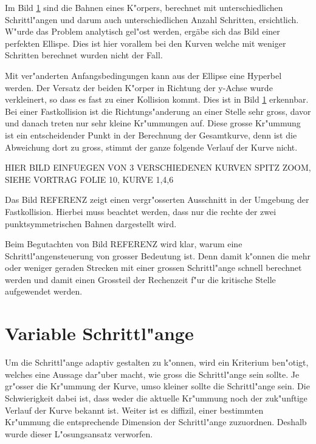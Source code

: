 \begin{refsection}
\begin{tabular}{|c|c|c|c|c|c|}
\end{tabular}

Im Bild \ref{} sind die Bahnen eines K"orpers, berechnet mit unterschiedlichen Schrittl"angen und darum auch unterschiedlichen Anzahl Schritten, ersichtlich.
W"urde das Problem analytisch gel"ost werden, ergäbe sich das Bild einer perfekten Ellispe.
Dies ist hier vorallem bei den Kurven welche mit weniger Schritten berechnet wurden nicht der Fall.

Mit ver"anderten Anfangsbedingungen kann aus der Ellipse eine Hyperbel werden.
Der Versatz der beiden K"orper in Richtung der y-Achse wurde verkleinert, so dass es fast zu einer Kollision kommt. 
Dies ist in Bild \ref{} erkennbar.
Bei einer Fastkollision ist die Richtungs"anderung an einer Stelle sehr gross, davor und danach treten nur sehr kleine Kr"ummungen auf.
Diese grosse Kr"ummung ist ein entscheidender Punkt in der Berechnung der Gesamtkurve, denn ist die Abweichung dort zu gross, stimmt der ganze folgende Verlauf der Kurve nicht. 

HIER BILD EINFUEGEN VON 3 VERSCHIEDENEN KURVEN SPITZ ZOOM, SIEHE VORTRAG FOLIE 10, KURVE 1,4,6

Das Bild REFERENZ zeigt einen vergr"osserten Ausschnitt in der Umgebung der Fastkollision.
Hierbei muss beachtet werden, dass nur die rechte der zwei punktsymmetrischen Bahnen dargestellt wird.

Beim Begutachten von Bild REFERENZ wird klar, warum eine Schrittl"angensteuerung von grosser Bedeutung ist.
Denn damit k"onnen die mehr oder weniger geraden Strecken mit einer grossen Schrittl"ange schnell berechnet werden und damit einen Grossteil der Rechenzeit f"ur die kritische Stelle aufgewendet werden.

 

\section{Variable Schrittl"ange}

Um die Schrittl"ange adaptiv gestalten zu k"onnen, wird ein Kriterium ben"otigt, welches eine Aussage dar"uber macht, wie gross die Schrittl"ange sein sollte.
Je gr"osser die Kr"ummung der Kurve, umso kleiner sollte die Schrittl"ange sein.
Die Schwierigkeit dabei ist, dass weder die aktuelle Kr"ummung noch der zuk"unftige Verlauf der Kurve bekannt ist.
Weiter ist es diffizil, einer bestimmten Kr"ummung die entsprechende Dimension der Schrittl"ange zuzuordnen.
Deshalb wurde dieser L"osungsansatz verworfen.


\end{refsection}
